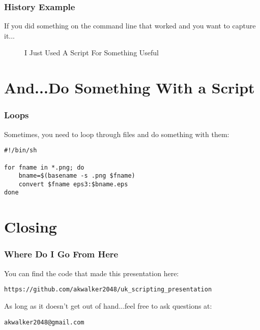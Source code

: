 \documentclass{beamer}
\begin{document}
\begin{frame}\frametitle{History Example}
    If you did something on the command line that worked and you want to capture it...

  \begin{figure}[!htb]
    \linewidth
    \begin{center}
    \end{center}
    \caption{I Just Used A Script For Something Useful}\label{fig:history-grep-example}
  \end{figure}
\end{frame}

\section{And...Do Something With a Script}
\begin{frame}[fragile]\frametitle{Loops}
  Sometimes, you need to loop through files and do something with them:
\begin{verbatim}
#!/bin/sh

for fname in *.png; do
    bname=$(basename -s .png $fname)
    convert $fname eps3:$bname.eps
done
\end{verbatim}
\end{frame}


\section{Closing}
\begin{frame}[fragile]\frametitle{Where Do I Go From Here}
  You can find the code that made this presentation here:
\begin{verbatim}
https://github.com/akwalker2048/uk_scripting_presentation
\end{verbatim}

As long as it doesn't get out of hand...feel free to ask questions at:
\begin{verbatim}
akwalker2048@gmail.com
\end{verbatim}
\end{frame}
\end{document}
